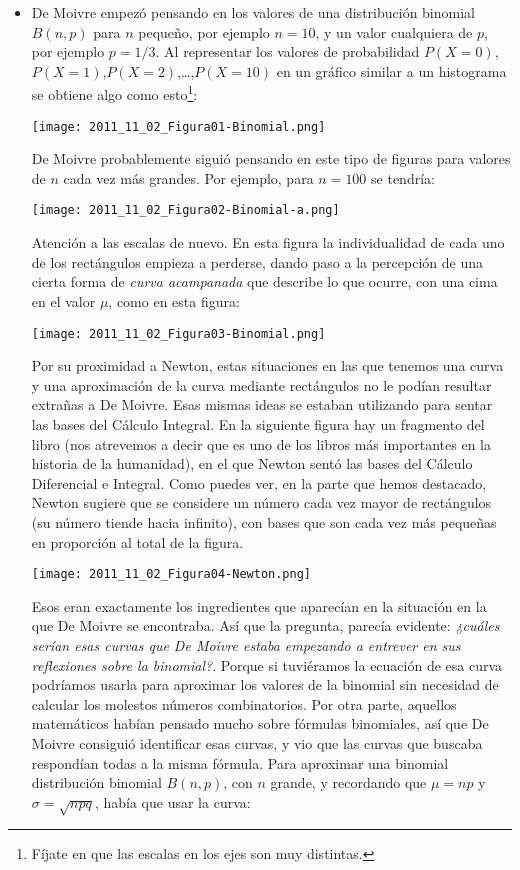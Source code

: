 \begin{itemize}
\item De Moivre empezó pensando en los valores de una distribución binomial $B(n,p)$ para $n$ pequeño, por ejemplo $n=10$, y un valor cualquiera de $p$, por ejemplo $p=1/3$. Al representar los valores de probabilidad $P(X=0)$, $P(X=1)$,$P(X=2)$,\dots,$P(X=10)$ en un gráfico similar a un histograma se obtiene algo como esto\footnote{Fíjate en que las escalas en los ejes son muy distintas.}:
   \begin{center}
   \texttt{[image: 2011\_11\_02\_Figura01-Binomial.png]}
   \end{center}
   De Moivre probablemente siguió pensando en este tipo de figuras para valores de $n$ cada vez más grandes. Por ejemplo, para $n=100$ se tendría:
   \begin{center}
   \texttt{[image: 2011\_11\_02\_Figura02-Binomial-a.png]}
   \end{center}
   Atención a las escalas de nuevo. En esta figura la individualidad de cada uno de los rectángulos empieza a perderse, dando paso a la percepción de una cierta forma de {\em curva acampanada} que describe lo que ocurre, con una cima en el valor $\mu$, como en esta figura:
   \begin{center}
   \texttt{[image: 2011\_11\_02\_Figura03-Binomial.png]}
   \end{center}
   Por su proximidad a Newton, estas situaciones en las que tenemos una curva y una aproximación de la curva mediante rectángulos no le podían resultar extrañas a De Moivre. Esas mismas ideas se estaban utilizando para sentar las bases del Cálculo Integral. En la siguiente figura hay un fragmento del libro  (nos atrevemos a decir que es uno de los libros más importantes en la historia de la humanidad), en el que Newton sentó las bases del Cálculo Diferencial e Integral. Como puedes ver, en la parte que hemos destacado, Newton sugiere que se considere un número cada vez mayor de rectángulos (su número tiende hacia infinito), con bases que son cada vez más pequeñas en proporción al total de la figura.
   \begin{center}
   \texttt{[image: 2011\_11\_02\_Figura04-Newton.png]}
   \end{center}
    Esos eran exactamente los ingredientes que aparecían en la situación en la que De Moivre se encontraba. Así que la pregunta, parecía evidente: {\em ¿cuáles serían esas curvas que De Moivre estaba empezando a entrever en sus reflexiones sobre la binomial?}.  Porque si tuviéramos la ecuación de esa curva podríamos usarla para aproximar los valores de la binomial sin necesidad de calcular los molestos números combinatorios. Por otra parte, aquellos matemáticos habían pensado mucho sobre fórmulas binomiales, así que De Moivre consiguió identificar esas curvas, y vio que las curvas que buscaba respondían todas a la misma fórmula. Para aproximar una binomial distribución binomial $B(n,p)$, con $n$ grande, y recordando que $\mu=np$ y $\sigma=\sqrt{npq}$, había que usar la curva:

\end{itemize}

